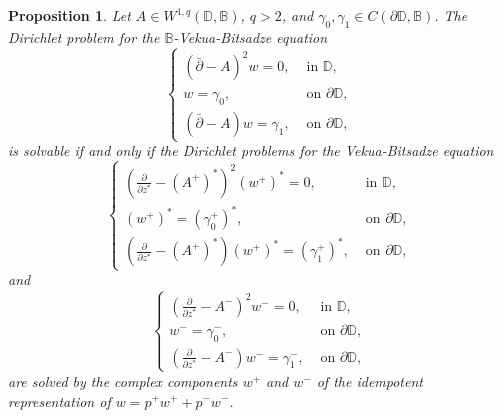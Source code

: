 \documentclass[12pt,reqno]{amsart}
\newtheorem{prop}[theorem]{Proposition}
\theoremstyle{definition}
\theoremstyle{remark}
\newcommand{\p}{\partial}
\newcommand{\dbar}{\bar\partial}
\newcommand{\bc}{\mathbb{B}}
\newcommand{\disk}{\mathbb{D}}
\begin{document}
            \begin{prop}
                Let $A \in W^{1,q}(\disk,\bc)$, $q>2$, and $\gamma_0, \gamma_1 \in C(\p\disk,\bc)$. The Dirichlet problem for the $\bc$-Vekua-Bitsadze equation
                \[
                    \begin{cases}
                        (\dbar - A)^2 w = 0, & \text{ in } \disk, \\
                        w = \gamma_0, & \text{ on } \p\disk,\\
                        (\dbar - A)w = \gamma_1, & \text{ on } \p\disk,
                    \end{cases}
                \]
                is solvable if and only if the Dirichlet problems for the Vekua-Bitsadze equation
                \[
                    \begin{cases}
                        \left( \frac{\p}{\p z^*} - (A^+)^*\right)^2 (w^+)^* = 0, & \text{ in } \disk,\\
                        (w^+)^* = (\gamma_0^+)^*, &\text{ on } \p\disk,\\
                        \left( \frac{\p}{\p z^*} - (A^+)^*\right) (w^+)^* = (\gamma_1^+)^*, & \text{ on } \p\disk,
                    \end{cases}
                \]
                and 
                \[
                    \begin{cases}
                        \left( \frac{\p}{\p z^*} - A^-\right)^2 w^- = 0, & \text{ in } \disk,\\
                        w^- = \gamma_0^-, &\text{ on } \p\disk,\\
                        \left( \frac{\p}{\p z^*} - A^-\right) w^- = \gamma_1^-, & \text{ on } \p\disk,
                    \end{cases}
                \]
                are solved by the complex components $w^+$ and $w^-$ of the idempotent representation of $w = p^+ w^+ + p^- w^-$. 
            \end{prop}
\end{document}
